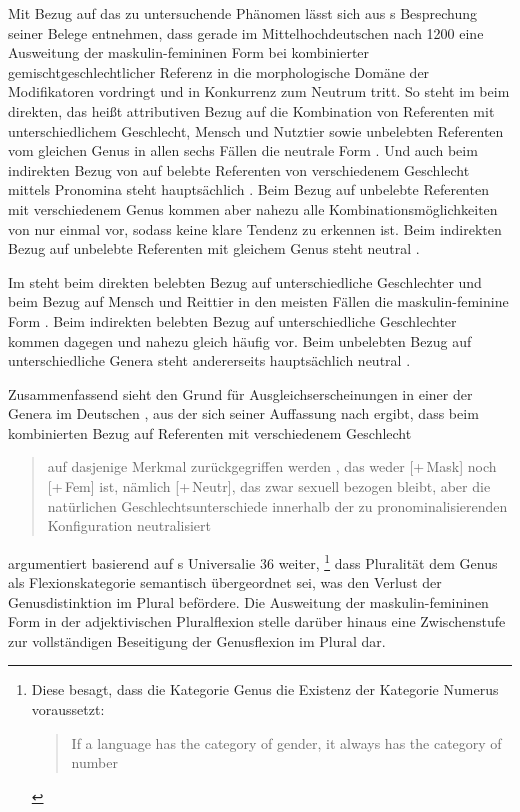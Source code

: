 Mit Bezug auf das zu untersuchende Phänomen lässt sich aus
\citeauthor{askedal1973}s Besprechung seiner Belege entnehmen, dass gerade im
Mittelhochdeutschen nach 1200 eine Ausweitung der
maskulin-femininen Form bei kombinierter gemischt\-geschlechtlicher Referenz in
die morphologische Domäne der Modifikatoren vordringt und in Konkurrenz zum
Neutrum tritt. So steht im  beim direkten, das heißt attributiven
Bezug auf die Kombination von Referenten mit unterschiedlichem Geschlecht,
Mensch und Nutztier sowie unbelebten Referenten vom gleichen Genus in allen
sechs Fällen die neutrale Form . Und auch beim indirekten Bezug
von  auf belebte Referenten von verschiedenem
Geschlecht mittels Pronomina steht hauptsächlich . Beim Bezug
auf unbelebte Referenten mit verschiedenem Genus kommen aber nahezu alle
Kombinationsmöglichkeiten von  nur einmal vor,
sodass keine klare Tendenz zu erkennen ist. Beim indirekten Bezug auf unbelebte
Referenten mit gleichem Genus steht neutral
 \autocites[145--148,
158--161]{askedal1973}[nach][]{lachmannhartl1952}.

Im  steht beim direkten belebten Bezug auf
unterschiedliche Geschlechter und beim Bezug auf Mensch und Reittier in den
meisten Fällen die maskulin-feminine Form . Beim indirekten
belebten Bezug auf unterschiedliche Geschlechter kommen dagegen
 und  nahezu gleich häufig vor. Beim unbelebten
Bezug auf unterschiedliche Genera steht andererseits hauptsächlich neutral
 \autocites[95--99,
126--128]{askedal1973}[nach][]{maroldschroeder1969}.

Zusammenfassend sieht \citeauthor{askedal1973} den Grund für
Ausgleichserscheinungen in einer  der Genera im
Deutschen \autocite[241--247]{askedal1973}, aus der sich
seiner Auffassung nach ergibt, dass beim kombinierten Bezug auf Referenten mit
verschiedenem Geschlecht \blockcquote[253]{askedal1973}{auf dasjenige Merkmal
zurückgegriffen werden , das weder [+\,Mask] noch [+\,Fem] ist,
nämlich [+\,Neutr], das zwar sexuell bezogen bleibt, aber die natürlichen
Geschlechts\-unterschiede innerhalb der zu pronominalisierenden Konfiguration
neutralisiert}. \citet[173--177]{askedal1973} argumentiert basierend auf
\citeauthor{greenberg1966}s Universalie 36 weiter,%
%
	\footnote{Diese besagt, dass die Kategorie Genus die Existenz der Kategorie
		Numerus voraussetzt:
		\foreignblockcquote{english}[112]{greenberg1966}{If a language has
		the category of gender, it always has the category of number}.%
	}
%
dass Pluralität dem Genus als Flexionskategorie semantisch übergeordnet sei,
was den Verlust der Genusdistinktion im Plural befördere. Die Ausweitung der
maskulin-femininen Form in der adjektivischen
Plural\-flexion stelle darüber hinaus eine
Zwischenstufe zur vollständigen Beseitigung der Genusflexion im Plural dar.

